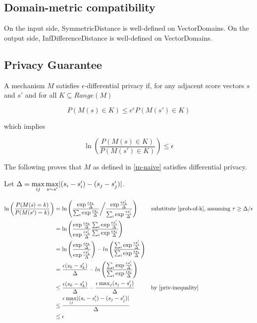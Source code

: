 \subsection{Domain-metric compatibility}
On the input side, SymmetricDistance is well-defined on VectorDomains. 
On the output side, InfDifferenceDistance is well-defined on VectorDomains.

\subsection{Privacy Guarantee}
A mechanism $M$ satisfies $\epsilon$-differential privacy if, for any adjacent score vectors $s$ and $s'$ and for all $K \subseteq Range(M)$

\begin{equation}
    P(M(s) \in K) \leq e^\epsilon P(M(s') \in K)
\end{equation}

which implies

\begin{equation}
    \label{ln-defn}
    \ln\left(\frac{P(M(s) \in K)}{P(M(s') \in K)}\right)  \leq \epsilon
\end{equation}

The following proves that $M$ as defined in \ref{m-naive} satisfies differential privacy.

Let $\Delta = \max\limits_{ij} \max\limits_{s \sim s'} \lvert(s_i - s'_i) - (s_j - s'_j)\rvert$.

\begin{align*}
    \ln\left(\frac{P(M(s) = k)}{P(M(s') = k)}\right) &= \ln \left(
        \frac
            {\exp{\frac{\epsilon s_k}{\Delta}}}
            {\sum_{i} \exp{\frac{\epsilon s_i}{\Delta}}
        }
        \bigg/ \frac
            {\exp{\frac{\epsilon s'_k}{\Delta}}}
            {\sum_{i} \exp{\frac{\epsilon s'_i}{\Delta}}} \right)
        &&\text{substitute \ref{prob-of-k}, assuming } \tau \geq \Delta / \epsilon \\
    &= \ln \left(\frac
        {\exp{\frac{\epsilon s_k}{\Delta}}}{\exp{\frac{\epsilon s'_k}{\Delta}}}
        \frac{\sum_{i} \exp{\frac{\epsilon s'_i}{\Delta}}}{\sum_{i} \exp{\frac{\epsilon s_i}{\Delta}}}\right) \\
    &= \ln \left(\frac
        {\exp{\frac{\epsilon s_k}{\Delta}}}{\exp{\frac{\epsilon s'_k}{\Delta}}}\right) - ln \left(
        \frac{\sum_{i} \exp{\frac{\epsilon s'_i}{\Delta}}}{\sum_{i} \exp{\frac{\epsilon s_i}{\Delta}}}\right) \\
    &= \frac{\epsilon (s_k - s'_k)}{\Delta} 
        - ln\left(\frac{\sum_{i} \exp{\frac{\epsilon s'_i}{\Delta}}}{\sum_{i} \exp{\frac{\epsilon s_i}{\Delta}}}\right) \\
    &\leq \frac{\epsilon (s_k - s'_k)}{\Delta} - \frac{\epsilon \max_j (s_j - s'_j)}{\Delta} &&\text{by \ref{priv-inequality}} \\
    &\leq \frac{\epsilon\max\limits_{ij} \lvert(s_i - s'_i) - (s_j - s'_j)\rvert}{\Delta} \\
    &\leq \epsilon
\end{align*}

